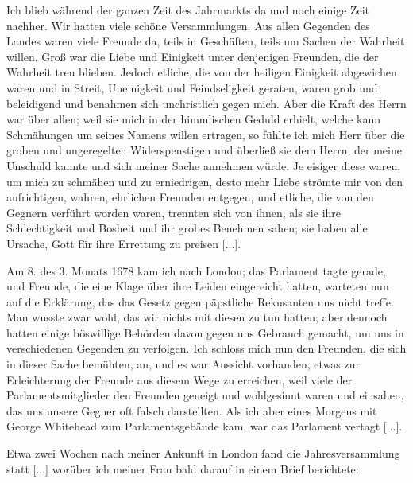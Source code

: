 Ich blieb während der ganzen Zeit des Jahrmarkts da und
noch einige Zeit nachher. Wir hatten viele schöne Versammlungen.
Aus allen Gegenden des Landes waren viele Freunde da, teils
in Geschäften, teils um Sachen der Wahrheit willen. Groß war
die Liebe und Einigkeit unter denjenigen Freunden, die der
Wahrheit treu blieben. Jedoch etliche, die von der heiligen
Einigkeit abgewichen waren und in Streit, Uneinigkeit und 
Feindseligkeit geraten, waren grob und beleidigend und benahmen sich
unchristlich gegen mich.
 Aber die Kraft des Herrn war über
allen; weil sie mich in der himmlischen Geduld erhielt, welche
kann Schmähungen um seines Namens willen ertragen, so fühlte
ich mich Herr über die groben und ungeregelten Widerspenstigen
und überließ sie dem Herrn, der meine Unschuld kannte und sich
meiner Sache annehmen würde. Je eisiger diese waren, um
mich zu schmähen und zu erniedrigen, desto mehr Liebe strömte
mir von den aufrichtigen, wahren, ehrlichen Freunden entgegen,
und etliche, die von den Gegnern verführt worden waren, trennten
sich von ihnen, als sie ihre Schlechtigkeit und Bosheit und ihr
grobes Benehmen sahen; sie haben alle Ursache, Gott für ihre
Errettung zu preisen [...].

Am 8. des 3. Monats 1678 kam ich nach London; 
das Parlament tagte gerade, und Freunde, die eine Klage über ihre Leiden 
eingereicht hatten, warteten nun auf die Erklärung, das das Gesetz
gegen päpstliche Rekusanten uns nicht treffe. Man wusste zwar
wohl, das wir nichts mit diesen zu tun hatten; aber dennoch
hatten einige böswillige Behörden davon gegen uns Gebrauch
gemacht, um uns in verschiedenen Gegenden zu verfolgen. Ich
schloss mich nun den Freunden, die sich in dieser Sache bemühten,
an, und es war Aussicht vorhanden, etwas zur Erleichterung der
Freunde aus diesem Wege zu erreichen, weil viele der 
Parlamentsmitglieder den Freunden geneigt und wohlgesinnt waren und
einsahen, das uns unsere Gegner oft falsch darstellten. Als ich
aber eines Morgens mit George Whitehead 
zum Parlamentsgebäude kam, war das Parlament vertagt [...].

Etwa zwei Wochen nach meiner Ankunft in London fand
die Jahresversammlung statt [...] 
worüber ich meiner Frau
bald darauf in einem Brief berichtete: 

